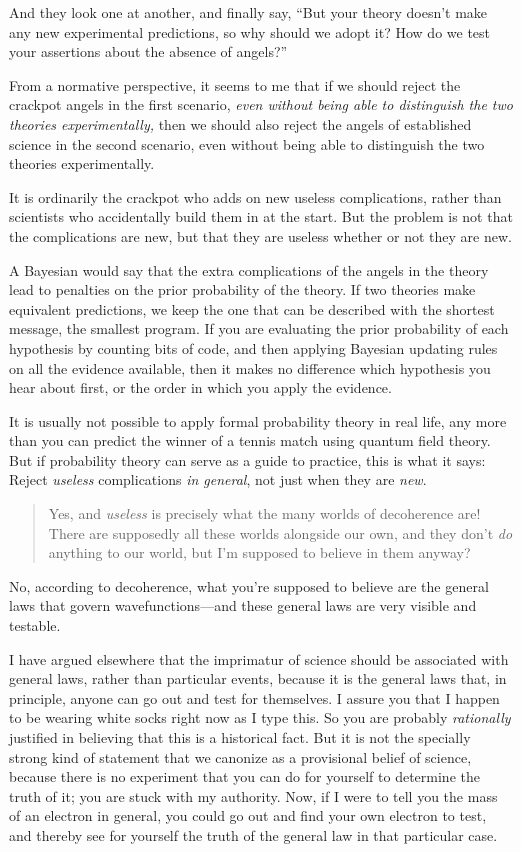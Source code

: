 {
 And they look one at another, and finally say,
``But your theory doesn't make any new
experimental predictions, so why should we adopt it? How do we test
your assertions about the absence of angels?''}

{
 From a normative perspective, it seems to me that if we should
reject the crackpot angels in the first scenario, \textit{even without
being able to distinguish the two theories experimentally,} then we
should also reject the angels of established science in the second
scenario, even without being able to distinguish the two theories
experimentally.}

{
 It is ordinarily the crackpot who adds on new useless
complications, rather than scientists who accidentally build them in at
the start. But the problem is not that the complications are new, but
that they are useless whether or not they are new.}

{
 A Bayesian would say that the extra complications of the angels in
the theory lead to penalties on the prior probability of the theory. If
two theories make equivalent predictions, we keep the one that can be
described with the shortest message, the smallest program. If you are
evaluating the prior probability of each hypothesis by counting bits of
code, and then applying Bayesian updating rules on all the evidence
available, then it makes no difference which hypothesis you hear about
first, or the order in which you apply the evidence.}

{
 It is usually not possible to apply formal probability theory in
real life, any more than you can predict the winner of a tennis match
using quantum field theory. But if probability theory can serve as a
guide to practice, this is what it says: Reject \textit{useless}
complications \textit{in general}, not just when they are
\textit{new}.}

\begin{quote}
{
 Yes, and \textit{useless} is precisely what the many worlds of
decoherence are! There are supposedly all these worlds alongside our
own, and they don't \textit{do} anything to our world,
but I'm supposed to believe in them anyway?}
\end{quote}

{
 No, according to decoherence, what you're supposed
to believe are the general laws that govern wavefunctions---and these
general laws are very visible and testable.}

{
 I have argued elsewhere that the imprimatur of science should be
associated with general laws, rather than particular events, because it
is the general laws that, in principle, anyone can go out and test for
themselves. I assure you that I happen to be wearing white socks right
now as I type this. So you are probably \textit{rationally} justified
in believing that this is a historical fact. But it is not the
specially strong kind of statement that we canonize as a provisional
belief of science, because there is no experiment that you can do for
yourself to determine the truth of it; you are stuck with my authority.
Now, if I were to tell you the mass of an electron in general, you
could go out and find your own electron to test, and thereby see for
yourself the truth of the general law in that particular case.}

